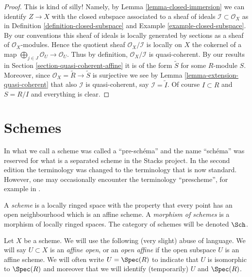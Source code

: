 \begin{proof}
This is kind of silly! Namely, by Lemma \ref{lemma-closed-immersion}
we can identify $Z \to X$ with the closed subspace associated to
a sheaf of ideals $\mathcal{I} \subset \mathcal{O}_X$ as in
Definition \ref{definition-closed-subspace} and
Example \ref{example-closed-subspace}.
By our conventions this sheaf of ideals is locally generated
by sections as a sheaf of $\mathcal{O}_X$-modules.
Hence the quotient sheaf $\mathcal{O}_X / \mathcal{I}$
is locally on $X$ the cokernel
of a map $\bigoplus_{j \in J} \mathcal{O}_U \to \mathcal{O}_U$.
Thus by definition, $\mathcal{O}_X / \mathcal{I}$ is quasi-coherent.
By our results in Section \ref{section-quasi-coherent-affine}
it is of the form $\widetilde S$ for some $R$-module $S$.
Moreover, since $\mathcal{O}_X = \widetilde R \to \widetilde S$
is surjective we see by Lemma \ref{lemma-extension-quasi-coherent}
that also $\mathcal{I}$ is quasi-coherent, say $\mathcal{I} = \widetilde I$.
Of course $I \subset R$ and $S = R/I$ and everything is clear.
\end{proof}













\section{Schemes}
\label{section-schemes}

\begin{definition}
\label{definition-scheme}
\begin{history}
In \cite{EGA1} what we call a scheme was called a ``pre-sch\'ema'' and the
name ``sch\'ema'' was reserved for what is a separated scheme in the
Stacks project. In the second edition \cite{EGA1-second} the terminology
was changed to the terminology that is now standard. However, one may
occasionally encounter the terminology ``prescheme'', for example in
\cite{Murre-lectures}.
\end{history}
A {\it scheme} is a locally ringed space with the property that
every point has an open neighbourhood which is an affine scheme.
A {\it morphism of schemes} is a morphism of locally
ringed spaces. The category of schemes will be denoted
$\Sch$.
\end{definition}

\noindent
Let $X$ be a scheme.
We will use the following (very slight) abuse of language.
We will say $U \subset X$ is an {\it affine open}, or an {\it open affine}
if the open subspace $U$ is an affine scheme. We will often
write $U = \Spec(R)$ to indicate that $U$ is isomorphic
to $\Spec(R)$ and moreover that we will identify (temporarily)
$U$ and $\Spec(R)$.

